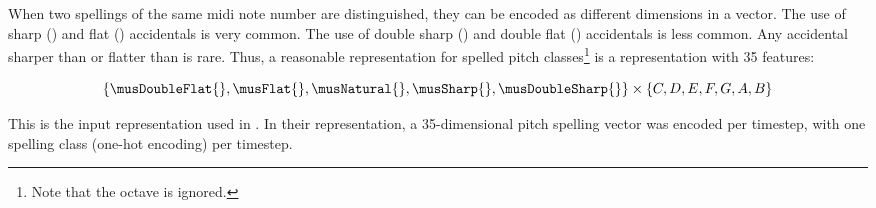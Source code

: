 
When two spellings of the same \gls{midi} note number are
distinguished, they can be encoded as different dimensions
in a vector. The use of sharp (\musSharp{}) and flat
(\musFlat{}) accidentals is very common. The use of double
sharp (\musDoubleSharp{}) and double flat (\musDoubleFlat{})
accidentals is less common. Any accidental sharper than
\musDoubleSharp{} or flatter than \musDoubleFlat{} is rare.
Thus, a reasonable representation for spelled pitch
classes\footnote{Note that the octave is ignored.} is a
representation with 35 features:

\begin{equation}
\{\musDoubleFlat{}, \musFlat{}, \musNatural{},
\musSharp{}, \musDoubleSharp{} \}
\times 
\{C, D, E, F, G, A, B \}
\end{equation}

This is the input representation used in
\textcite{micchi2020not, micchi2021deep}. In their
representation, a 35-dimensional pitch spelling vector was
encoded per timestep, with one spelling class (one-hot
encoding) per timestep.
